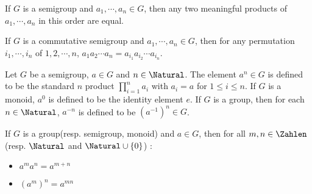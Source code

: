\begin{theorem}
	If $ G $ is a semigroup and $ a_1,\cdots,a_n \in G $, then any two meaningful products of $ a_1,\cdots,a_n  $ in this order are equal.
\end{theorem}
\begin{theorem}
	If $ G $ is a commutative semigroup and $ a_1,\cdots,a_n \in G $, then for any permutation $ i_1,\cdots,i_n $ of $ 1,2,\cdots,n $, $ a_1 a_2 \cdots a_n = a_{i_1}a_{i_2}\cdots a_{i_n} $.
\end{theorem}
\begin{definition}
	Let $ G $ be a semigroup, $ a \in G$ and $ n \in \Natural $. The element $ a^n \in G $ is defined to be the standard $ n $ product $ \prod_{i=1}^{n}a_i $ with $ a_i=a  $ for $ 1 \leqslant i \leqslant n $. If $ G $ is a monoid, $ a^0 $ is defined to be the identity element $ e $. If $ G $ is a group, then for each $ n \in \Natural $, $ a^{-n} $ is defined to be $ (a^{-1})^n \in G $.
\end{definition}
\begin{theorem}
	If $ G $ is a group(resp. semigroup, monoid) and $ a \in G $, then for all $ m,n \in \Zahlen $ (resp. $ \Natural $ and $ \Natural \cup \{0\} $) :
	\begin{itemize}
		\item $ a^m a^n = a^{m+n} $ \item $ (a^m)^n=a^{mn} $
	\end{itemize}
\end{theorem}